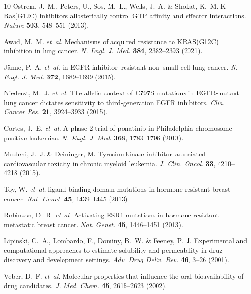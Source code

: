 \documentclass[11pt,a4paper]{article}
\begin{document}
\begin{thebibliography}{10}
Ostrem, J.~M., Peters, U., Sos, M.~L., Wells, J.~A. \& Shokat, K.~M.
\newblock K-{Ras(G12C)} inhibitors allosterically control {GTP} affinity and effector interactions.
\newblock \emph{Nature} \textbf{503}, 548--551 (2013).

Awad, M.~M. \emph{et~al.}
\newblock Mechanisms of acquired resistance to {KRAS(G12C)} inhibition in lung cancer.
\newblock \emph{N. Engl. J. Med.} \textbf{384}, 2382--2393 (2021).

J{\"a}nne, P.~A. \emph{et~al.}
 in {EGFR} inhibitor--resistant non--small-cell lung cancer.
\newblock \emph{N. Engl. J. Med.} \textbf{372}, 1689--1699 (2015).

Niederst, M.~J. \emph{et~al.}
\newblock The allelic context of {C797S} mutations in {EGFR-mutant} lung cancer dictates sensitivity to third-generation {EGFR} inhibitors.
\newblock \emph{Clin. Cancer Res.} \textbf{21}, 3924--3933 (2015).

Cortes, J.~E. \emph{et~al.}
\newblock A phase 2 trial of ponatinib in {Philadelphia} chromosome--positive leukemias.
\newblock \emph{N. Engl. J. Med.} \textbf{369}, 1783--1796 (2013).

Moslehi, J.~J. \& Deininger, M.
\newblock Tyrosine kinase inhibitor--associated cardiovascular toxicity in chronic myeloid leukemia.
\newblock \emph{J. Clin. Oncol.} \textbf{33}, 4210--4218 (2015).

Toy, W. \emph{et~al.}
 ligand-binding domain mutations in hormone-resistant breast cancer.
\newblock \emph{Nat. Genet.} \textbf{45}, 1439--1445 (2013).

Robinson, D.~R. \emph{et~al.}
\newblock Activating {ESR1} mutations in hormone-resistant metastatic breast cancer.
\newblock \emph{Nat. Genet.} \textbf{45}, 1446--1451 (2013).

Lipinski, C.~A., Lombardo, F., Dominy, B.~W. \& Feeney, P.~J.
\newblock Experimental and computational approaches to estimate solubility and permeability in drug discovery and development settings.
\newblock \emph{Adv. Drug Deliv. Rev.} \textbf{46}, 3--26 (2001).

Veber, D.~F. \emph{et~al.}
\newblock Molecular properties that influence the oral bioavailability of drug candidates.
\newblock \emph{J. Med. Chem.} \textbf{45}, 2615--2623 (2002).


\end{thebibliography}
\end{document}
